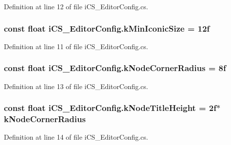 Definition at line 12 of file i\+C\+S\+\_\+\+Editor\+Config.\+cs.

\hypertarget{classi_c_s___editor_config_a45c9251484ba31b906ec6d21a23b7150}{
\subsubsection[{k\+Min\+Iconic\+Size}]{\setlength{\rightskip}{0pt plus 5cm}const float i\+C\+S\+\_\+\+Editor\+Config.\+k\+Min\+Iconic\+Size = 12f}}\label{classi_c_s___editor_config_a45c9251484ba31b906ec6d21a23b7150}


Definition at line 11 of file i\+C\+S\+\_\+\+Editor\+Config.\+cs.

\hypertarget{classi_c_s___editor_config_a477b2889d3d589f855216e31d69a8d9d}{
\subsubsection[{k\+Node\+Corner\+Radius}]{\setlength{\rightskip}{0pt plus 5cm}const float i\+C\+S\+\_\+\+Editor\+Config.\+k\+Node\+Corner\+Radius = 8f}}\label{classi_c_s___editor_config_a477b2889d3d589f855216e31d69a8d9d}


Definition at line 13 of file i\+C\+S\+\_\+\+Editor\+Config.\+cs.

\hypertarget{classi_c_s___editor_config_a6e2c62f935932ead7d763aa19bb8ffa0}{
\subsubsection[{k\+Node\+Title\+Height}]{\setlength{\rightskip}{0pt plus 5cm}const float i\+C\+S\+\_\+\+Editor\+Config.\+k\+Node\+Title\+Height = 2f$\ast$k\+Node\+Corner\+Radius}}\label{classi_c_s___editor_config_a6e2c62f935932ead7d763aa19bb8ffa0}


Definition at line 14 of file i\+C\+S\+\_\+\+Editor\+Config.\+cs.

